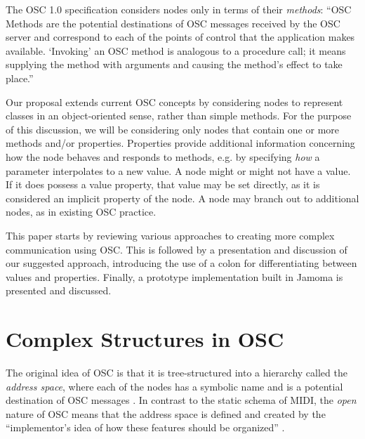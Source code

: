 \documentclass{NIME-alternate}
\begin{document}

The OSC 1.0 specification \cite{Wright:2002} considers nodes only in terms of their \emph{methods}: ``OSC Methods are the potential destinations of OSC messages received by the OSC server and correspond to each of the points of control that the application makes available. `Invoking' an OSC method is analogous to a procedure call; it means supplying the method with arguments and causing the method's effect to take place.'' 

Our proposal extends current OSC concepts by considering nodes to represent classes in an object-oriented sense, rather than simple methods.  For the purpose of this discussion, we will be considering only nodes that contain one or more methods and/or properties. Properties provide additional information concerning how the node behaves and responds to methods, e.g. by specifying \emph{how} a parameter interpolates to a new value. A node might or might not have a value. If it does possess a value property, that value may be set directly, as it is considered an implicit property of the node. A node may branch out to additional nodes, as in existing OSC practice.

This paper starts by reviewing various approaches to creating more complex communication using OSC. This is followed by a presentation and discussion of our suggested approach, introducing the use of a colon for differentiating between values and properties. Finally, a prototype implementation built in Jamoma is presented and discussed. 





\section{Complex Structures in OSC} %
\label{sec:complex_structures_in_OSC}


The original idea of OSC is that it is tree-structured into a hierarchy called the \emph{address space}, where each of the nodes has a symbolic name and is a potential destination of OSC messages \cite{Wright:1997}. In contrast to the static schema of MIDI, the \emph{open} nature of OSC means that the address space is defined and created by the ``implementor's idea of how these features should be organized'' \cite[p.~153]{Wright:2003}.
\end{document}
